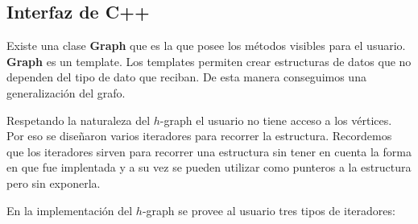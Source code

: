\documentclass[a4paper,12pt]{article}
\begin{document}
\subsection{Interfaz de C++}




Existe una clase \textbf{Graph} que es la que posee los métodos visibles para el usuario.
\textbf{Graph} es un template. Los templates permiten crear estructuras de datos que no dependen del tipo de dato que reciban. De esta manera conseguimos una generalización del grafo.

Respetando la naturaleza del $h$-graph el usuario no tiene acceso a los vértices. Por eso se diseñaron varios iteradores para recorrer la estructura.
Recordemos que los iteradores sirven para recorrer una estructura sin tener en cuenta la forma en que fue implentada y a su vez se pueden utilizar como punteros a la estructura pero sin exponerla.

En la implementación del $h$-graph se provee al usuario tres tipos de iteradores:
\end{document}
